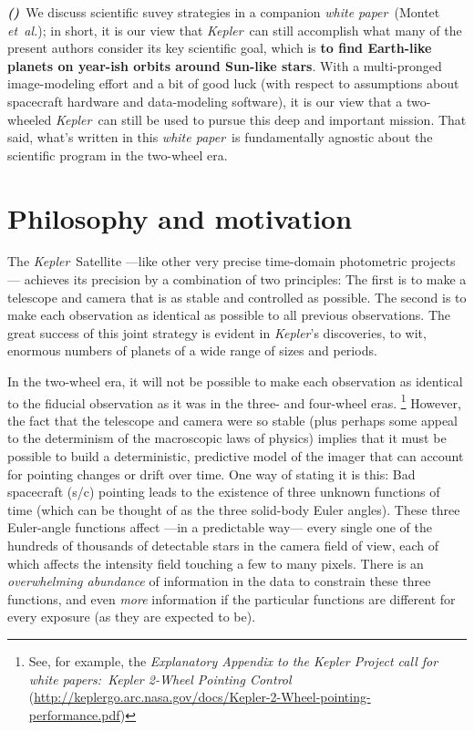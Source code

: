 \documentclass[letterpaper,12pt,whitepaper]{haastex}
\newcommand{\documentname}{\textsl{white paper}}
\newcommand{\foreign}[1]{\textit{#1}}
\newcommand{\etal}{\foreign{et~al.}}
\newcommand{\observatory}[1]{\textsl{#1}}
\newcommand{\Kepler}{\observatory{Kepler}}
\newcounter{inlineitem}
\newcommand{\binlineitem}{\refstepcounter{inlineitem}\textbf{\textsl{(\theinlineitem)}}}
\begin{document}
\binlineitem~We discuss scientific suvey strategies in a companion \documentname\ (Montet \etal);
  in short, it is our view that \Kepler\ can still accomplish
  what many of the present authors consider its key scientific goal,
  which is \textbf{to find Earth-like planets on year-ish orbits around Sun-like stars}.
With a multi-pronged image-modeling effort and
  a bit of good luck
  (with respect to assumptions about spacecraft hardware and data-modeling software),
  it is our view that a two-wheeled \Kepler\ can still
  be used to pursue this deep and important mission.
That said, what's written in this \documentname\ is fundamentally
  agnostic about the scientific program in the two-wheel era.

\clearpage
\section{Philosophy and motivation}

The \Kepler\ Satellite%
  ---like other very precise time-domain photometric projects---%
  achieves its precision by a combination of two principles:
The first is to make a telescope and camera that is as stable and controlled as possible.
The second is to make each observation as identical as possible to all previous observations.
The great success of this joint strategy is evident in \Kepler's discoveries, to wit,
  enormous numbers of planets of a wide range of sizes and periods.

In the two-wheel era, it will not be possible
  to make each observation as identical to the fiducial observation
  as it was in the three- and four-wheel eras.%
  \footnote{See, for example, the \textit{Explanatory Appendix to the Kepler Project
      call for white papers:\ Kepler 2-Wheel Pointing Control}
    (\url{http://keplergo.arc.nasa.gov/docs/Kepler-2-Wheel-pointing-performance.pdf})}
However, the fact that the telescope and camera were so stable
  (plus perhaps some appeal to the determinism of the macroscopic laws of physics)
  implies that it must be possible to build a deterministic, predictive model
  of the imager that can account for pointing changes or drift over time.
One way of stating it is this:
Bad spacecraft (s/c) pointing leads to the existence of
  three unknown functions of time
  (which can be thought of as the three solid-body Euler angles).
These three Euler-angle functions affect%
  ---in a predictable way---%
  every single one of the hundreds of thousands of detectable stars
  in the camera field of view,
  each of which affects the intensity field touching a few to many pixels.
There is an \emph{overwhelming abundance} of information in the data
  to constrain these three functions,
  and even \emph{more} information if the particular functions
  are different for every exposure (as they are expected to be).
\end{document}
